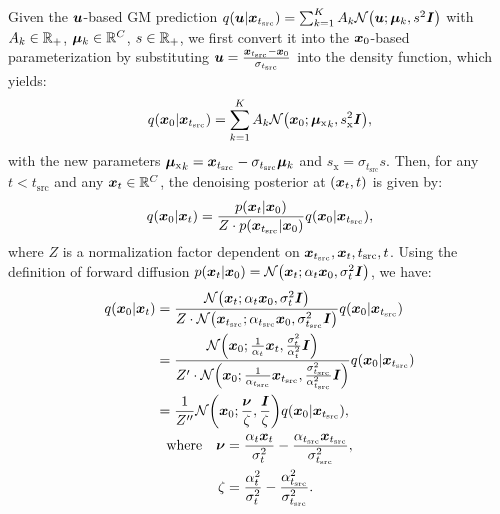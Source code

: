Given the ${\bm{u}}$-based GM prediction $q(\vu | \vx_{t_\text{src}}) = \sum_{k=1}^K A_k \mathcal{N}\left(\vu; \vmu_k, s^2\mI\right)$ with $A_k \in \mathbb{R}_+$, ${\bm{\mu}}_k \in \mathbb{R}^C$, $s \in \mathbb{R}_+ $, we first convert it into the ${{\bm{x}}_0}$-based parameterization by substituting ${\bm{u}} = \frac{{\bm{x}}_{t_\text{src}} - {\bm{x}}_0}{\sigma_{t_\text{src}}}$ into the density function, which yields: 
\begin{align}
    q(\vx_0 | \vx_{t_\text{src}}) = \sum_{k=1}^K A_k \mathcal{N}\left(\vx_0; {\vmu_\text{x}}_k, s_\text{x}^2 \mI \right),
\end{align}
with the new parameters ${{\bm{\mu}}_\text{x}}_k = {\bm{x}}_{t_\text{src}} - \sigma_{t_\text{src}} {\bm{\mu}}_k$ and $s_\text{x} = \sigma_{t_\text{src}} s$. Then, for any $t < t_\text{src}$ and any ${\bm{x}}_t \in \mathbb{R}^C$, the denoising posterior at $({\bm{x}}_t, t)$ is given by:
\begin{align}
    q({\bm{x}}_0|{\bm{x}}_t) = \frac{p({\bm{x}}_t | {\bm{x}}_0)}{Z \cdot p({\bm{x}}_{t_\text{src}}|{\bm{x}}_0)} q({\bm{x}}_0 | {\bm{x}}_{t_\text{src}}),
\end{align}
where $Z$ is a normalization factor dependent on ${\bm{x}}_{t_\text{src}}, {\bm{x}}_t, t_\text{src}, t$. Using the definition of forward diffusion $p(\vx_t|\vx_0) = \mathcal{N}\left(\vx_t;\alpha_t \vx_0, \sigma_t^2 \mI \right)$, we have:
\begin{gather}
\begin{aligned}
    q(\vx_0|\vx_t) 
    &= \frac{\mathcal{N}\left(\vx_t;\alpha_t \vx_0, \sigma_t^2 \mI \right)}{Z \cdot \mathcal{N}\left(\vx_{t_\text{src}};\alpha_{t_\text{src}} \vx_0, \sigma_{t_\text{src}}^2 \mI \right)} q(\vx_0 | \vx_{t_\text{src}}) \notag \\
    &= \frac{
        \mathcal{N}\left(\vx_0;\frac{1}{\alpha_t }\vx_t, \frac{\sigma_t^2}{\alpha_t^2} \mI\right)
    }{
        Z^\prime \cdot \mathcal{N}\left(\vx_0;\frac{1}{\alpha_{t_\text{src}} }\vx_{t_\text{src}}, \frac{\sigma_{t_\text{src}}^2}{\alpha_{t_\text{src}}^2} \mI\right)
    } q(\vx_0 | \vx_{t_\text{src}}) \notag \\
    &= \frac{1}{Z^{\prime\prime}} 
    \mathcal{N} \left(
        \vx_0 ; 
        \frac{\vnu}{\zeta}, 
        \frac{\mI}{\zeta} 
    \right) q(\vx_0 | \vx_{t_\text{src}}),
\end{aligned}
\\
\begin{aligned}
    \text{where} \quad \vnu &= \frac{ \alpha_t\vx_t }{\sigma_t^2} - \frac{ \alpha_{t_\text{src}} \vx_{t_\text{src}} }{\sigma_{t_\text{src}}^2}, \notag \\
    \zeta &= \frac{\alpha_t^2}{\sigma_t^2} - \frac{\alpha_{t_\text{src}}^2}{\sigma_{t_\text{src}}^2}. \notag
\end{aligned}
\end{gather}
